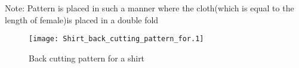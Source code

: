 \documentclass[10pt]{article}
\begin{document}
 
Note: Pattern is placed in such a manner where the cloth(which is equal to the length of female)is placed in a double fold
\begin{figure}[!ht]

\texttt{[image: Shirt\_back\_cutting\_pattern\_for.1]}
\caption{Back cutting pattern for a shirt}
\end{figure}
\end{document}
